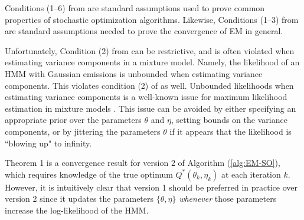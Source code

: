 Conditions (1--6) from \citet{Johnson:2013} are standard assumptions used to prove common properties of stochastic optimization algorithms. Likewise, Conditions (1--3) from \citet{Wu:1983} are standard assumptions needed to prove the convergence of EM in general. 

Unfortunately, Condition (2) from \citet{Wu:1983} can be restrictive, and is often violated when estimating variance components in a mixture model. Namely, the likelihood of an HMM with Gaussian emissions is unbounded when estimating variance components. This violates condition (2) of \citet{Johnson:2013} as well. Unbounded likelihoods when estimating variance components is a well-known issue for maximum likelihood estimation in mixture models \citep{Chen:2009,Liu:2015b}. This issue can be avoided by either specifying an appropriate prior over the parameters $\theta$ and $\eta$, setting bounds on the variance components, or by jittering the parameters $\theta$ if it appears that the likelihood is ``blowing up" to infinity.

Theorem 1 is a convergence result for version 2 of Algorithm (\ref{alg:EM-SO}), which requires knowledge of the true optimum $Q^*(\theta_{k},\eta_{k})$ at each iteration $k$. However, it is intuitively clear that version 1 should be preferred in practice over version 2 since it updates the parameters $\{\theta,\eta\}$ \textit{whenever} those parameters increase the log-likelihood of the HMM.



%
%

